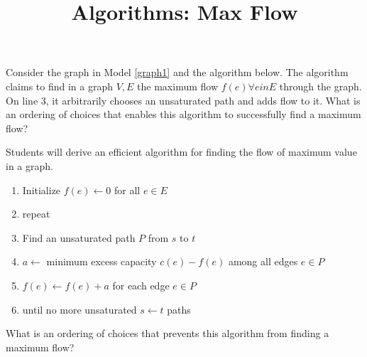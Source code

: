 \documentclass{tufte-handout}
\title{Algorithms: Max Flow}
\date{}
\begin{document}
\maketitle

\begin{questions}

\item Consider the graph in Model \ref{graph1} and the algorithm below. The algorithm claims to find in a graph $V, E$ the maximum flow $f(e) \forall e in E$ through the graph. On line 3, it arbitrarily chooses an unsaturated path and adds flow to it. What is an ordering of choices that enables this algorithm to successfully find a maximum flow?

\begin{objective}
  Students will derive an efficient algorithm for finding the flow of maximum value in a graph.
\end{objective}

\begin{enumerate}
    \item Initialize $f(e) \leftarrow 0$ for all $e \in E$
    \item repeat
    \item \hspace{1cm} Find an unsaturated path $P$ from $s$ to $t$
    \item \hspace{1cm} $a \leftarrow$ minimum excess capacity $c(e) - f(e)$ among all edges $e \in P$
    \item \hspace{1cm} $f(e) \leftarrow f(e) + a$ for each edge $e \in P$
    \item until no more unsaturated $s \leftarrow t$ paths
\end{enumerate}

\item What is an ordering of choices that prevents this algorithm from finding a maximum flow?



\end{questions}
\end{document}
